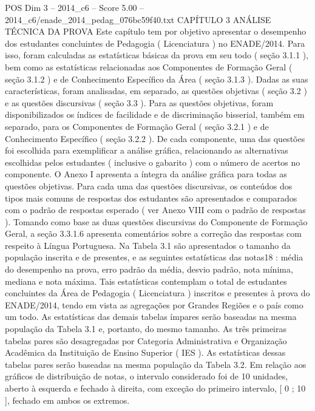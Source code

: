 \begin{textsample}{POS Dim 3 – 2014\_c6 – Score 5.00 – 2014\_c6/enade\_2014\_pedag\_076bc59f40.txt}  \label{ex:f3_pos_037}
CAPÍTULO 3 ANÁLISE TÉCNICA DA PROVA Este capítulo tem por objetivo apresentar o desempenho dos estudantes concluintes de Pedagogia ( Licenciatura ) no ENADE/2014.
Para isso, foram calculadas as estatísticas básicas da prova em seu todo ( seção 3.1.1 ), bem como as estatísticas relacionadas aos Componentes de Formação Geral ( seção 3.1.2 ) e de Conhecimento Específico da Área ( seção 3.1.3 ).
Dadas as suas características, foram analisadas, em separado, as questões objetivas ( seção 3.2 ) e as questões discursivas ( seção 3.3 ).
Para as questões objetivas, foram disponibilizados os índices de facilidade e de discriminação bisserial, também em separado, para os Componentes de Formação Geral ( seção 3.2.1 ) e de Conhecimento Específico ( seção 3.2.2 ).
De cada componente, uma das questões foi escolhida para exemplificar a análise gráfica, relacionando as alternativas escolhidas pelos estudantes ( inclusive o gabarito ) com o número de acertos no componente.
O Anexo I apresenta a íntegra da análise gráfica para todas as questões objetivas.
Para cada uma das questões discursivas, os conteúdos dos tipos mais comuns de respostas dos estudantes são apresentados e comparados com o padrão de respostas esperado ( ver Anexo VIII com o padrão de respostas ).
Tomando como base as duas questões discursivas do Componente de Formação Geral, a seção 3.3.1.6 apresenta comentários sobre a correção das respostas com respeito à Língua Portuguesa.
Na Tabela 3.1 são apresentados o tamanho da população inscrita e de presentes, e as seguintes estatísticas das notas18 : média do desempenho na prova, erro padrão da média, desvio padrão, nota mínima, mediana e nota máxima.
Tais estatísticas contemplam o total de estudantes concluintes da Área de Pedagogia ( Licenciatura ) inscritos e presentes à prova do ENADE/2014, tendo em vista as agregações por Grandes Regiões e o país como um todo.
As estatísticas das demais tabelas ímpares serão baseadas na mesma população da Tabela 3.1 e, portanto, do mesmo tamanho.
As três primeiras tabelas pares são desagregadas por Categoria Administrativa e Organização Acadêmica da Instituição de Ensino Superior ( IES ).
As estatísticas dessas tabelas pares serão baseadas na mesma população da Tabela 3.2.
Em relação aos gráficos de distribuição de notas, o intervalo considerado foi de 10 unidades, aberto à esquerda e fechado à direita, com exceção do primeiro intervalo, [ 0 ; 10 ], fechado em ambos os extremos.

\end{textsample}

